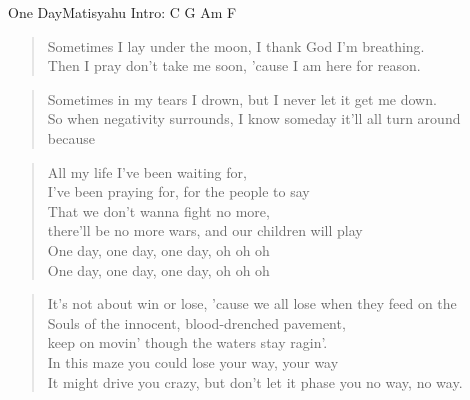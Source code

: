 \begin{song}{One Day}{Matisyahu}
		Intro: C G Am F \\
		
		\begin{verse}
			 \quad Sometimes I lay under the moon, I thank God I'm breathing. \\
			 \quad Then I pray don't take me soon, 'cause I am here for reason. \\
		\end{verse}
		
		\begin{verse}
			Sometimes in my tears I drown, but I never let it get me down. \\
			So when negativity surrounds, I know someday it'll all turn around because \\
		\end{verse}
		
		\begin{verse}
			All my life I've been waiting for, \\
			I've been praying for, for the people to say \\
			That we don't wanna fight no more, \\
			there'll be no more wars, and our children will play \\
			One day, one day, one day,  oh oh oh \\
			One day, one day, one day,  oh oh oh \\
		\end{verse}
		
		\begin{verse}
			It's not about win or lose, 'cause we all lose when they feed on the \\
			Souls of the innocent, blood-drenched pavement,  \\
			keep on movin' though the waters stay ragin'. \\
			In this maze you could lose your way, your way \\
			It might drive you crazy, but don't let it phase you no way, no way. \\
		\end{verse}
		

\end{song}
